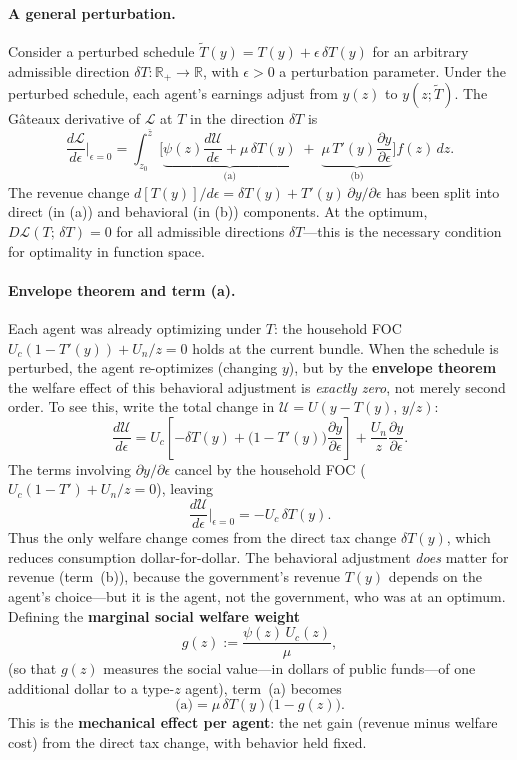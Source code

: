 \documentclass[12pt,a4paper]{article}
\theoremstyle{definition}
\theoremstyle{plain}
\theoremstyle{remark}
\newcommand{\R}{\mathbb{R}}
\newcommand{\zbar}{\bar{z}}
\newcommand{\zlow}{z_{\scriptscriptstyle 0}}
\newcommand{\calU}{\mathcal{U}}
\begin{document}
\paragraph{A general perturbation.}
Consider a perturbed schedule $\tilde T(y) = T(y) + \epsilon\,\delta T(y)$ for an arbitrary admissible direction $\delta T: \R_+ \to \R$, with $\epsilon > 0$ a perturbation parameter. Under the perturbed schedule, each agent's earnings adjust from $y(z)$ to $y(z;\tilde T)$. The Gâteaux derivative of $\mathcal{L}$ at $T$ in the direction $\delta T$ is
\begin{equation}
\label{eq:dL-total-1D}
\frac{d\mathcal L}{d\epsilon}\bigg|_{\epsilon=0}
=
\int_{\zlow}^{\zbar}
\biggl[
\underbrace{
  \psi(z)\frac{d\calU}{d\epsilon}
  + \mu\,\delta T(y)
}_{\text{(a)}}
\;+\;
\underbrace{
  \mu\,T'(y)\frac{\partial y}{\partial\epsilon}
}_{\text{(b)}}
\biggr]
f(z)\,dz.
\end{equation}
The revenue change
$d[T(y)]/d\epsilon = \delta T(y) + T'(y)\,\partial y/\partial\epsilon$
has been split into direct (in (a)) and behavioral (in (b))
components. At the optimum, $D\mathcal{L}(T;\, \delta T) = 0$ for all admissible directions $\delta T$---this is the necessary condition for optimality in function space.

\paragraph{Envelope theorem and term (a).}
Each agent was already optimizing under $T$: the household FOC
$U_c(1-T'(y)) + U_n/z = 0$ holds at the current bundle. When the
schedule is perturbed, the agent re-optimizes (changing $y$),
but by the \textbf{envelope theorem} the welfare effect of
this behavioral adjustment is \emph{exactly zero}, not merely
second order. To see this, write the total change in
$\calU = U(y-T(y),\,y/z)$:
\[
\frac{d\calU}{d\epsilon}
= U_c\!\left[-\delta T(y)
  + \bigl(1-T'(y)\bigr)\frac{\partial y}{\partial\epsilon}
  \right]
+ \frac{U_n}{z}\frac{\partial y}{\partial\epsilon}.
\]
The terms involving $\partial y/\partial\epsilon$ cancel by the
household FOC ($U_c(1-T') + U_n/z = 0$), leaving
\[
\frac{d\calU}{d\epsilon}\bigg|_{\epsilon=0}
= -U_c\,\delta T(y).
\]
Thus the only welfare change comes from the direct tax change
$\delta T(y)$, which reduces consumption dollar-for-dollar.
The behavioral adjustment \emph{does} matter for revenue
(term~(b)), because the government's revenue $T(y)$ depends on
the agent's choice---but it is the agent, not the government,
who was at an optimum. Defining the \textbf{marginal social welfare weight}
\begin{equation}
\label{eq:g-pert}
  g(z) := \frac{\psi(z)\,U_c(z)}{\mu},
\end{equation}
(so that $g(z)$ measures the social value---in dollars of
public funds---of one additional dollar to a type-$z$ agent),
term~(a) becomes
\begin{equation}
\label{eq:term-a-1D}
\text{(a)}
= \mu\,\delta T(y)\bigl(1 - g(z)\bigr).
\end{equation}
This is the \textbf{mechanical effect per agent}: the net gain (revenue
minus welfare cost) from the direct tax change, with behavior
held fixed.
\end{document}
